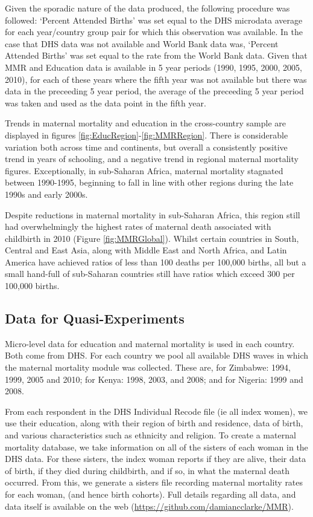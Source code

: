 \documentclass{article}
\begin{document}
\begin{spacing}{1.4}
Given the sporadic nature of the data produced, the following procedure was 
followed: `Percent Attended Births' was set equal to the DHS microdata average 
for each year/country group pair for which this observation was available.  In 
the case that DHS data was not available and World Bank data was, `Percent 
Attended Births' was set equal to the rate from the World Bank data.  Given that 
MMR and Education data is available in 5 year periods (1990, 1995, 2000, 2005, 
2010), for each of these years where the fifth year was not available but there 
was data in the preceeding 5 year period, the average of the preceeding 5 year 
period was taken and used as the data point in the fifth year.

Trends in maternal mortality and education in the cross-country sample are 
displayed in figures \ref{fig:EducRegion}-\ref{fig:MMRRegion}. There is 
considerable variation both across time and continents, but overall a 
consistently positive trend in years of schooling, and a negative trend in 
regional maternal mortality figures. Exceptionally, in sub-Saharan Africa, 
maternal mortality stagnated between 1990-1995, beginning to fall in line with 
other regions during the late 1990s and early 2000s.

Despite reductions in maternal mortality in sub-Saharan Africa, this region still 
had overwhelmingly the highest rates of maternal death associated with childbirth 
in 2010 (Figure \ref{fig:MMRGlobal}). Whilst certain countries in South, Central 
and East Asia, along with Middle East and North Africa, and Latin America have 
achieved ratios of less than 100 deaths per 100,000 births, all but a small 
hand-full of sub-Saharan countries still have ratios which exceed 300 per 100,000 
births.

\subsection{Data for Quasi-Experiments}
Micro-level data for education and maternal mortality is used in each country.
Both come from DHS.  For each country we pool all available DHS waves in which
the maternal mortality module was collected.  These are, for Zimbabwe: 1994, 
1999, 2005 and 2010; for Kenya: 1998, 2003, and 2008; and for Nigeria: 1999 and
2008.

From each respondent in the DHS Individual Recode file (ie all index women), we
use their education, along with their region of birth and residence, data of 
birth, and various characteristics such as ethnicity and religion.  To create a
maternal mortality database, we take information on all of the sisters of each
woman in the DHS data.  For these sisters, the index woman reports if they are
alive, their data of birth, if they died during childbirth, and if so, in what 
the maternal death occurred.  From this, we generate a sisters file recording 
maternal mortality rates for each woman, (and hence birth cohorts). Full details
regarding all data, and data itself is available on the web
(\url{https://github.com/damiancclarke/MMR}).


\end{spacing}
\end{document}
